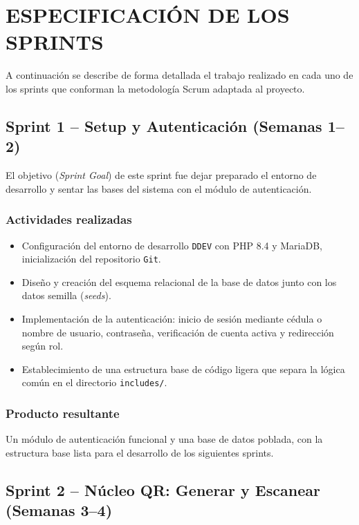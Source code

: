 \documentclass[12pt, letterpaper, oneside]{report}
\begin{document}
\chapter{ESPECIFICACI\'ON DE LOS SPRINTS}

A continuaci\'on se describe de forma detallada el trabajo realizado en cada uno de los sprints que conforman la metodolog\'ia Scrum adaptada al proyecto.

\section{Sprint 1 -- Setup y Autenticaci\'on (Semanas 1--2)}

El objetivo (\emph{Sprint Goal}) de este sprint fue dejar preparado el entorno de desarrollo y sentar las bases del sistema con el m\'odulo de autenticaci\'on.

\subsection{Actividades realizadas}

\begin{itemize}
  \item Configuraci\'on del entorno de desarrollo \texttt{DDEV} con PHP 8.4 y MariaDB, inicializaci\'on del repositorio \texttt{Git}.
  \item Dise\~no y creaci\'on del esquema relacional de la base de datos junto con los datos semilla (\emph{seeds}).
  \item Implementaci\'on de la autenticaci\'on: inicio de sesi\'on mediante c\'edula o nombre de usuario, contrase\~na, verificaci\'on de cuenta activa y redirecci\'on seg\'un rol.
  \item Establecimiento de una estructura base de c\'odigo ligera que separa la l\'ogica com\'un en el directorio \texttt{includes/}.
\end{itemize}

\subsection{Producto resultante}

Un m\'odulo de autenticaci\'on funcional y una base de datos poblada, con la estructura base lista para el desarrollo de los siguientes sprints.

\section{Sprint 2 -- N\'ucleo QR: Generar y Escanear (Semanas 3--4)}
\end{document}
